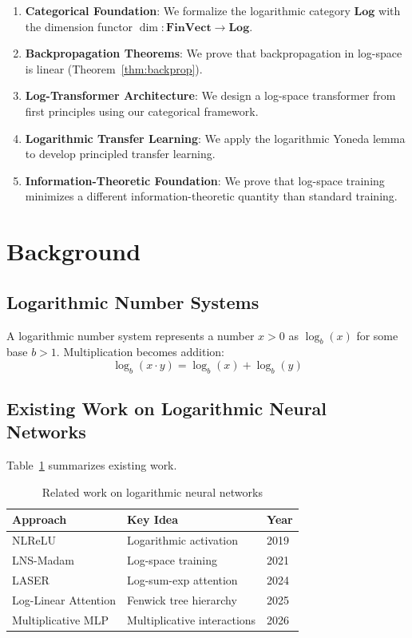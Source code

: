 \documentclass{article}
\begin{document}
\begin{enumerate}
    \item \textbf{Categorical Foundation}: We formalize the logarithmic category $\mathbf{Log}$ with the dimension functor $\dim: \mathbf{FinVect} \to \mathbf{Log}$.
    \item \textbf{Backpropagation Theorems}: We prove that backpropagation in log-space is linear (Theorem~\ref{thm:backprop}).
    \item \textbf{Log-Transformer Architecture}: We design a log-space transformer from first principles using our categorical framework.
    \item \textbf{Logarithmic Transfer Learning}: We apply the logarithmic Yoneda lemma to develop principled transfer learning.
    \item \textbf{Information-Theoretic Foundation}: We prove that log-space training minimizes a different information-theoretic quantity than standard training.
\end{enumerate}

\section{Background}

\subsection{Logarithmic Number Systems}

A logarithmic number system represents a number $x > 0$ as $\log_b(x)$ for some base $b > 1$. Multiplication becomes addition:
\[
\log_b(x \cdot y) = \log_b(x) + \log_b(y)
\]

\subsection{Existing Work on Logarithmic Neural Networks}

Table~\ref{tab:related} summarizes existing work.

\begin{table}[h]
\centering
\caption{Related work on logarithmic neural networks}
\label{tab:related}
\begin{tabular}{@{}lll@{}}
\toprule
\textbf{Approach} & \textbf{Key Idea} & \textbf{Year} \\
\midrule
NLReLU \cite{nlrelu2019} & Logarithmic activation & 2019 \\
LNS-Madam \cite{lns_madam2021} & Log-space training & 2021 \\
LASER \cite{laser2024} & Log-sum-exp attention & 2024 \\
Log-Linear Attention \cite{loglinear2025} & Fenwick tree hierarchy & 2025 \\
Multiplicative MLP \cite{mult_mlp2026} & Multiplicative interactions & 2026 \\
\bottomrule
\end{tabular}
\end{table}
\end{document}
